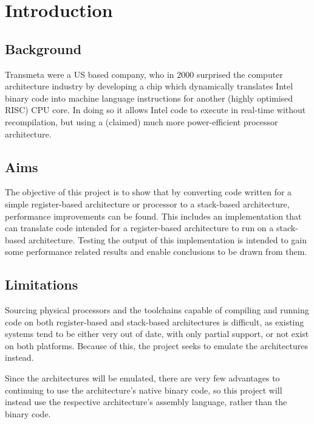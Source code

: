 \chapter{Introduction}\label{ch:introduction}
\section{Background}
Transmeta were a US based company, who in 2000 surprised the computer
architecture industry by developing a chip which dynamically translates Intel
binary code into machine language instructions for another (highly optimised
RISC) CPU core. In doing so it allows Intel code to execute in real-time without
recompilation, but using a (claimed) much more power-efficient processor
architecture.

\section{Aims}
The objective of this project is to show that by converting code written for a
simple register-based architecture or processor to a stack-based architecture,
performance improvements can be found. This includes an implementation that can
translate code intended for a register-based architecture to run on a
stack-based architecture. Testing the output of this implementation is intended
to gain some performance related results and enable conclusions to be drawn from
them.

\section{Limitations}
Sourcing physical processors and the toolchains capable of compiling and running
code on both register-based and stack-based architectures is difficult, as
existing systems tend to be either very out of date, with only partial support,
or not exist on both platforms. Because of this, the project seeks to emulate
the architectures instead.

Since the architectures will be emulated, there are very few advantages to
continuing to use the architecture's native binary code, so this project will
instead use the respective architecture's assembly language, rather than the
binary code.

